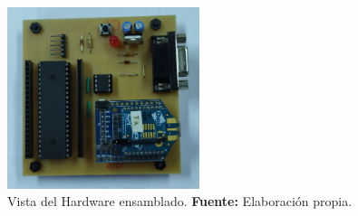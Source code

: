 \begin{figure}[H]
	\centering
	\includegraphics[width=0.5\textwidth]{./Cap4imagen/cto_ensamblado_4.jpg}
	\caption[Vista del Hardware ensamblado.]{Vista del Hardware ensamblado.\textbf{ Fuente:} Elaboración propia.}
	\label{Esch10} %
\end{figure}








